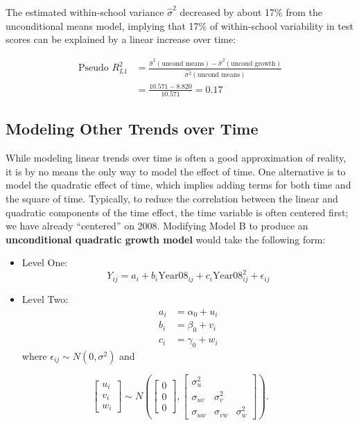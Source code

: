 \documentclass[
]{krantz}
\begin{document}
The estimated within-school variance \(\hat{\sigma}^2\) decreased by about 17\% from the unconditional means model, implying that 17\% of within-school variability in test scores can be explained by a linear increase over time:

\begin{align*}
\textrm{Pseudo }R^2_{L1} & = \frac{\hat{\sigma}^2(\textrm{uncond means}) - \hat{\sigma}^2(\textrm{uncond growth})}{\hat{\sigma^2}(\textrm{uncond means})} \\
 & = \frac{10.571-8.820}{10.571}= 0.17
\end{align*}

\hypertarget{othertimetrends}{%
\subsection{Modeling Other Trends over Time}\label{othertimetrends}}

While modeling linear trends over time is often a good approximation of reality, it is by no means the only way to model the effect of time. One alternative is to model the quadratic effect of time, which implies adding terms for both time and the square of time. Typically, to reduce the correlation between the linear and quadratic components of the time effect, the time variable is often centered first; we have already ``centered'' on 2008. Modifying Model B to produce an \textbf{unconditional quadratic growth model} would take the following form:

\begin{itemize}
\item
  Level One:
  \begin{equation*}
  Y_{ij}=a_{i}+b_{i}\textrm{Year08}_{ij}+c_{i}\textrm{Year08}^{2}_{ij} + \epsilon_{ij}
  \end{equation*}
\item
  Level Two:
  \begin{align*}
  a_{i} & = \alpha_{0} + u_{i}\\
  b_{i} & = \beta_{0} + v_{i}\\
  c_{i} & = \gamma_{0} + w_{i}
  \end{align*}
  where \(\epsilon_{ij}\sim N(0,\sigma^2)\) and
\end{itemize}

\[ \left[ \begin{array}{c}
            u_{i} \\ v_{i} \\ w_{i}
          \end{array}  \right] \sim N \left( \left[
          \begin{array}{c}
            0 \\ 0 \\ 0
          \end{array} \right], \left[
          \begin{array}{ccc}
            \sigma_{u}^{2} & & \\
            \sigma_{uv} & \sigma_{v}^{2} & \\
            \sigma_{uw} & \sigma_{vw} & \sigma_{w}^{2}
          \end{array} \right] \right) . \]
\end{document}
